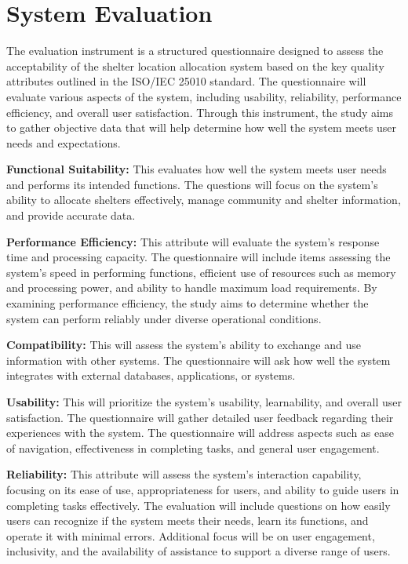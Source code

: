 \section{System Evaluation}

The evaluation instrument is a structured questionnaire designed to assess the acceptability of the shelter location allocation system based on the key quality attributes outlined in the ISO/IEC 25010 standard. The questionnaire will evaluate various aspects of the system, including usability, reliability, performance efficiency, and overall user satisfaction. Through this instrument, the study aims to gather objective data that will help determine how well the system meets user needs and expectations.

\textbf{Functional Suitability:} This evaluates how well the system meets user needs and performs its intended functions. The questions will focus on the system's ability to allocate shelters effectively, manage community and shelter information, and provide accurate data.

\textbf{Performance Efficiency:} This attribute will evaluate the system's response time and processing capacity. The questionnaire will include items assessing the system's speed in performing functions, efficient use of resources such as memory and processing power, and ability to handle maximum load requirements. By examining performance efficiency, the study aims to determine whether the system can perform reliably under diverse operational conditions.

\textbf{Compatibility:} This will assess the system’s ability to exchange and use information with other systems. The questionnaire will ask how well the system integrates with external databases, applications, or systems. 

\textbf{Usability:} This will prioritize the system's usability, learnability, and overall user satisfaction. The questionnaire will gather detailed user feedback regarding their experiences with the system. The questionnaire will address aspects such as ease of navigation, effectiveness in completing tasks, and general user engagement.

\textbf{Reliability:} This attribute will assess the system's interaction capability, focusing on its ease of use, appropriateness for users, and ability to guide users in completing tasks effectively. The evaluation will include questions on how easily users can recognize if the system meets their needs, learn its functions, and operate it with minimal errors. Additional focus will be on user engagement, inclusivity, and the availability of assistance to support a diverse range of users. 

